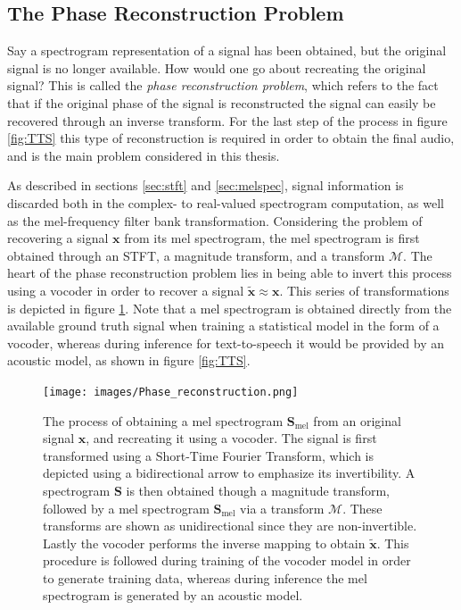 \documentclass{report}
\begin{document}
\subsection{The Phase Reconstruction Problem} \label{sec:phaseprob}

Say a spectrogram representation of a signal has been obtained, but the original signal is no longer available. How would one go about recreating the original signal? This is called the \textit{phase reconstruction problem}, which refers to the fact that if the original phase of the signal is reconstructed the signal can easily be recovered through an inverse transform. For the last step of the process in figure \ref{fig:TTS} this type of reconstruction is required in order to obtain the final audio, and is the main problem considered in this thesis.

As described in sections \ref{sec:stft} and \ref{sec:melspec}, signal information is discarded both in the complex- to real-valued spectrogram computation, as well as the mel-frequency filter bank transformation. Considering the problem of recovering a signal $\bm{x}$ from its mel spectrogram, the mel spectrogram is first obtained through an STFT, a magnitude transform, and a transform $\mathcal{M}$. The heart of the phase reconstruction problem lies in being able to invert this process using a vocoder in order to recover a signal $\tilde{\bm{x}} \approx \bm{x}$. This series of transformations is depicted in figure \ref{fig:phasere}. Note that a mel spectrogram is obtained directly from the available ground truth signal when training a statistical model in the form of a vocoder, whereas during inference for text-to-speech it would be provided by an acoustic model, as shown in figure \ref{fig:TTS}.

\begin{figure}[H]
    \centering
    \texttt{[image: images/Phase\_reconstruction.png]}
    \caption{\onehalfspacing The process of obtaining a mel spectrogram $\bm{S}_{\text{mel}}$ from an original signal $\bm{x}$, and recreating it using a vocoder. The signal is first transformed using a Short-Time Fourier Transform, which is depicted using a bidirectional arrow to emphasize its invertibility. A spectrogram $\bm{S}$ is then obtained though a magnitude transform, followed by a mel spectrogram $\bm{S}_{\text{mel}}$ via a transform $\mathcal{M}$. These transforms are shown as unidirectional since they are non-invertible. Lastly the vocoder performs the inverse mapping to obtain $\tilde{\bm{x}}$. This procedure is followed during training of the vocoder model in order to generate training data, whereas during inference the mel spectrogram is generated by an acoustic model.}
    \label{fig:phasere}
\end{figure}
\end{document}
